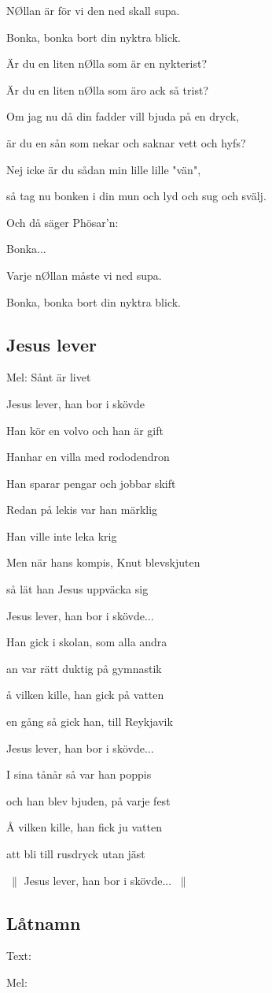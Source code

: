 NØllan är för vi den ned skall supa.

Bonka, bonka bort din nyktra blick.\bigskip



Är du en liten nØlla som är en nykterist?

Är du en liten nØlla som äro ack så trist?

Om jag nu då din fadder vill bjuda på en dryck,

är du en sån som nekar och saknar vett och hyfs?\bigskip



Nej icke är du sådan min lille lille "vän",

så tag nu bonken i din mun och lyd och sug och svälj.\bigskip



Och då säger Phösar'n:\bigskip



Bonka...\bigskip



Varje nØllan måste vi ned supa.

Bonka, bonka bort din nyktra blick.\bigskip



\subsection{\textbf{Jesus lever}}

Mel: Sånt är livet\bigskip

Jesus lever, han bor i skövde

Han kör en volvo och han är gift

Hanhar en villa med rododendron

Han sparar pengar och jobbar skift\bigskip

Redan på lekis var han märklig

Han ville inte leka krig

Men när hans kompis, Knut blevskjuten

så lät han Jesus uppväcka sig\bigskip

Jesus lever, han bor i skövde...\bigskip

Han gick i skolan, som alla andra

an var rätt duktig på gymnastik

å vilken kille, han gick på vatten

en gång så gick han, till Reykjavik\bigskip

Jesus lever, han bor i skövde...\bigskip

I sina tånår så var han poppis

och han blev bjuden, på varje fest

Å vilken kille, han fick ju vatten 

att bli till rusdryck utan jäst\bigskip

$\:\|$ Jesus lever, han bor i skövde... $\:\|$\bigskip

\subsection{\textbf{Låtnamn}}

Text: 

Mel: \bigskip

\newpage